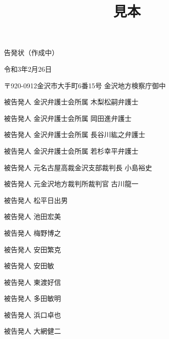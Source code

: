 \documentclass[
]{ltjarticle}
\title{見本}
\author{}
\date{}
\begin{document}
\maketitle
\fontsize{16pt}{0cm}\selectfont
\begin{center}
告発状（作成中）
\par\end{center}
\vspace{5mm}
\fontsize{11pt}{11pt}\selectfont
\vspace{3mm}
\begin{flushright}
令和3年2月26日
\par\end{flushright}
〒920-0912金沢市大手町6番15号 金沢地方検察庁御中

\fontsize{10pt}{10pt}\selectfont
\vspace{3mm}
\hspace{90mm}被告発人 金沢弁護士会所属 木梨松嗣弁護士

\hspace{90mm}被告発人 金沢弁護士会所属 岡田進弁護士

\hspace{90mm}被告発人 金沢弁護士会所属 長谷川紘之弁護士 

\hspace{90mm}被告発人 金沢弁護士会所属 若杉幸平弁護士

\hspace{90mm}被告発人 元名古屋高裁金沢支部裁判長 小島裕史 

\hspace{90mm}被告発人 元金沢地方裁判所裁判官 古川龍一

\hspace{90mm}被告発人 松平日出男

\hspace{90mm}被告発人 池田宏美 

\hspace{90mm}被告発人 梅野博之

\hspace{90mm}被告発人 安田繁克 

\hspace{90mm}被告発人 安田敏 

\hspace{90mm}被告発人 東渡好信 

\hspace{90mm}被告発人 多田敏明 

\hspace{90mm}被告発人 浜口卓也 

\hspace{90mm}被告発人 大網健二
\end{document}
